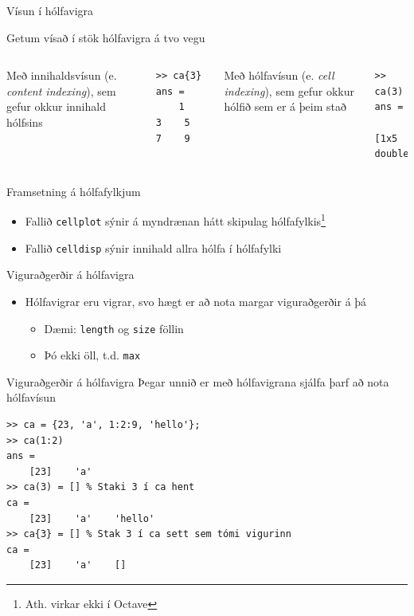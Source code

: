 \documentclass{beamer}
\begin{document}
\begin{frame}[fragile]{Vísun í hólfavigra}
\begin{center}
Getum vísað í stök hólfavigra á tvo vegu
\end{center}

\begin{columns}
Með innihaldsvísun (e. \emph{content indexing}), sem gefur okkur innihald hólfsins
\begin{verbatim}
>> ca{3}
ans =
    1    3    5    7    9
\end{verbatim}
Með hólfavísun (e. \emph{cell indexing}), sem gefur okkur hólfið sem er á þeim stað
\begin{verbatim}
>> ca(3)
ans = 
    [1x5 double]
\end{verbatim}
\end{columns}
\end{frame}

\begin{frame}{Framsetning á hólfafylkjum}
\begin{itemize}
 \item Fallið \texttt{cellplot} sýnir á myndrænan hátt skipulag hólfafylkis\footnote{Ath. virkar ekki í Octave}
 \item Fallið \texttt{celldisp} sýnir innihald allra hólfa í hólfafylki
\end{itemize}
\end{frame}

\begin{frame}{Viguraðgerðir á hólfavigra}
\begin{itemize}
 \item Hólfavigrar eru vigrar, svo hægt er að nota margar viguraðgerðir á þá
 \begin{itemize}
  \item Dæmi: \texttt{length} og \texttt{size} föllin
  \item Þó ekki öll, t.d. \texttt{max}
 \end{itemize}
\end{itemize}
\end{frame}

\begin{frame}[fragile]{Viguraðgerðir á hólfavigra}
Þegar unnið er með hólfavigrana sjálfa þarf að nota hólfavísun
\begin{verbatim}
>> ca = {23, 'a', 1:2:9, 'hello'};
>> ca(1:2)
ans = 
    [23]    'a'
>> ca(3) = [] % Staki 3 í ca hent
ca = 
    [23]    'a'    'hello'
>> ca{3} = [] % Stak 3 í ca sett sem tómi vigurinn
ca = 
    [23]    'a'    []
\end{verbatim}
\end{frame}
\end{document}
